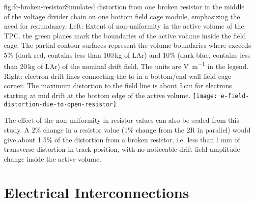 \begin{dunefigure}{fig:fc-broken-resistor}{Simulated \efield{} distortion from one broken resistor in the middle of the voltage divider chain on one bottom field cage module, emphasizing the need for redundancy. Left: Extent of \efield{} non-uniformity in the active volume of the TPC. the green planes mark the boundaries of the active volume inside the field cage. The partial contour surfaces represent the volume boundaries where \efield{} exceeds 5\% (dark red, contains less than 100\,kg of LAr) and 10\% (dark blue, contains less than 20\,kg of LAr) of the nominal drift field. The units are \si{\volt\per\m} in the legend. Right: electron drift lines connecting the  to  in a bottom/end wall field cage corner.  The maximum distortion to the field line is about 5\,cm for electrons starting at mid drift at the bottom edge of the active volume.}
\texttt{[image: e-field-distortion-due-to-open-resistor]}
\end{dunefigure}
The effect of the non-uniformity in resistor values can also be scaled from this study.  A 2\% change in a resistor value (1\% change from the 2R in parallel) would give about 1.5\% of the distortion from a broken resistor, i.e. less than 1\,mm of transverse distortion in track position, with no noticeable drift field amplitude change inside the active volume.
 


\section{Electrical Interconnections} %
\label{sec:fdsp-hv-design-interconnect}

